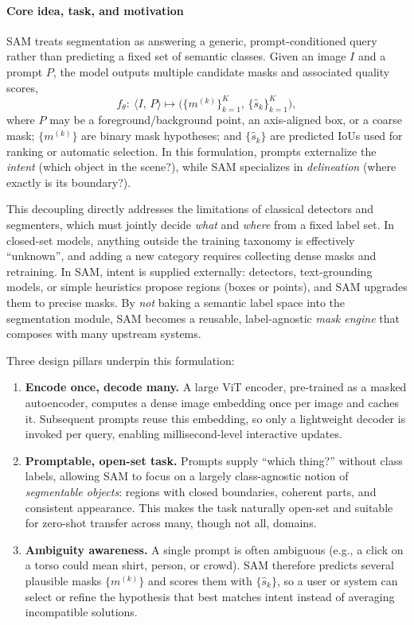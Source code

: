 \begin{enrichment}
\begin{enrichment}
		\paragraph{Core idea, task, and motivation}
		SAM treats segmentation as answering a generic, prompt-conditioned query rather than predicting a fixed set of semantic classes. Given an image \(I\) and a prompt \(P\), the model outputs multiple candidate masks and associated quality scores,
		\begin{equation}
			f_\theta:\ \langle I,\,P\rangle \longmapsto \big(\{m^{(k)}\}_{k=1}^{K},\,\{\hat{s}_k\}_{k=1}^{K}\big),
			\label{eq:chapter15_sam_prompt}
		\end{equation}
		where \(P\) may be a foreground/background point, an axis-aligned box, or a coarse mask; \(\{m^{(k)}\}\) are binary mask hypotheses; and \(\{\hat{s}_k\}\) are predicted IoUs used for ranking or automatic selection. In this formulation, prompts externalize the \emph{intent} (which object in the scene?), while SAM specializes in \emph{delineation} (where exactly is its boundary?).
		
		This decoupling directly addresses the limitations of classical detectors and segmenters, which must jointly decide \emph{what} and \emph{where} from a fixed label set. In closed-set models, anything outside the training taxonomy is effectively ``unknown'', and adding a new category requires collecting dense masks and retraining. In SAM, intent is supplied externally: detectors, text-grounding models, or simple heuristics propose regions (boxes or points), and SAM upgrades them to precise masks. By \emph{not} baking a semantic label space into the segmentation module, SAM becomes a reusable, label-agnostic \emph{mask engine} that composes with many upstream systems.
		
		Three design pillars underpin this formulation:
		\begin{enumerate}
			\item \textbf{Encode once, decode many.} A large ViT encoder, pre-trained as a masked autoencoder, computes a dense image embedding once per image and caches it. Subsequent prompts reuse this embedding, so only a lightweight decoder is invoked per query, enabling millisecond-level interactive updates.
			\item \textbf{Promptable, open-set task.} Prompts supply ``which thing?'' without class labels, allowing SAM to focus on a largely class-agnostic notion of \emph{segmentable objects}: regions with closed boundaries, coherent parts, and consistent appearance. This makes the task naturally open-set and suitable for zero-shot transfer across many, though not all, domains.
			\item \textbf{Ambiguity awareness.} A single prompt is often ambiguous (e.g., a click on a torso could mean shirt, person, or crowd). SAM therefore predicts several plausible masks \(\{m^{(k)}\}\) and scores them with \(\{\hat{s}_k\}\), so a user or system can select or refine the hypothesis that best matches intent instead of averaging incompatible solutions.
		\end{enumerate}
		

\end{enrichment}
\end{enrichment}
